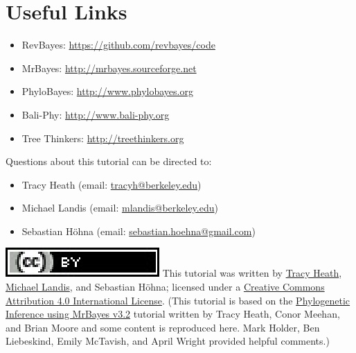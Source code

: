 \documentclass[11pt]{article}
\begin{document}
\bigskip
\section*{Useful Links}

\begin{itemize}
\item RevBayes: \href{https://github.com/revbayes/code}{https://github.com/revbayes/code} \\ \vspace{-7mm}
\item MrBayes: \href{http://mrbayes.sourceforge.net/}{http://mrbayes.sourceforge.net} \\ \vspace{-7mm}
\item PhyloBayes: \href{http://megasun.bch.umontreal.ca/People/lartillot/www/index.htm}{http://www.phylobayes.org} \\ \vspace{-7mm}
\item Bali-Phy: \href{http://www.bali-phy.org/}{http://www.bali-phy.org} \\ \vspace{-7mm}
\item Tree Thinkers: \href{http://treethinkers.org/}{http://treethinkers.org} \\ \vspace{-7mm}
\end{itemize}

Questions about this tutorial can be directed to: \\\vspace{-10mm}
\begin{itemize}
\item Tracy Heath (email: \href{mailto:tracyh@berkeley.edu}{tracyh@berkeley.edu}) \\\vspace{-8mm}
\item Michael Landis (email: \href{mailto:mlandis@berkeley.edu}{mlandis@berkeley.edu}) \\\vspace{-8mm} 
\item Sebastian H\"{o}hna (email: \href{mailto:sebastian.hoehna@gmail.com}{sebastian.hoehna@gmail.com})
\end{itemize}

\href{http://creativecommons.org/licenses/by/4.0/}{\includegraphics[scale=0.8]{figures/ccby.eps}} This tutorial was written by \href{http://phylo.bio.ku.edu/content/tracy-heath}{Tracy Heath}, \href{http://michaeljameslandis.com/}{Michael Landis}, and Sebastian H\"{o}hna; licensed under a \href{http://creativecommons.org/licenses/by/4.0/}{Creative Commons Attribution 4.0 International License}. 
(This tutorial is based on the \href{http://treethinkers.org/tutorials/phylogenetic-inference-using-mrbayes-v3-2/}{Phylogenetic Inference using MrBayes v3.2} tutorial written by Tracy Heath, Conor Meehan, and Brian Moore and some content is reproduced here.
Mark Holder, Ben Liebeskind, Emily McTavish, and April Wright provided helpful comments.)
\end{document}
